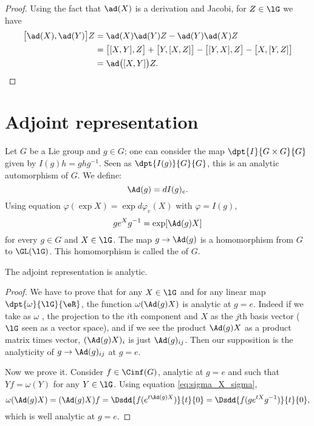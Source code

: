 \begin{proof}
    Using the fact that \( \ad(X)\) is a derivation and Jacobi, for \( Z\in\lG\) we have
    \begin{subequations}
        \begin{align}
            \big[ \ad(X),\ad(Y) \big]Z&=\ad(X)\ad(Y)Z-\ad(Y)\ad(X)Z\\
            &=\big[ [X,Y],Z \big]+\big[ Y,[X,Z] \big]-\big[ [Y,X],Z \big]-\big[ X,[Y,Z] \big]\\
            &=\ad\big( [X,Y] \big)Z.
        \end{align}
    \end{subequations}
\end{proof}

\section{Adjoint representation}

Let $G$ be a Lie group and $g\in G$; one can consider the map $\dpt{I}{G\times G}{G}$ given by $I(g)h=g hg^{-1}$. Seen as $\dpt{I(g)}{G}{G}$, this is an analytic automorphism of $G$. We define:
\[
    \Ad(g)=dI(g)_e.
\]
Using equation $\varphi(\exp X)=\exp d\varphi_e(X)$ with $\varphi=I(g)$,
\begin{equation}\label{eq:sigma_X_sigma}
  g e^{X}g^{-1}=\exp[ \Ad(g)X ]
\end{equation}
for every $g\in G$ and $X\in\lG$. The map $g\to\Ad(g)$ is a homomorphism from $G$ to $\GL(\lG)$. This homomorphism is called the  of $G$.

\begin{proposition}
The adjoint representation is analytic.
\end{proposition}

\begin{proof}
We have to prove that for any $X\in\lG$ and for any linear map $\dpt{\omega}{\lG}{\eR}$, the function $\omega(\Ad(g)X)$ is analytic at $g=e$. Indeed if we take as $\omega$ , the projection to the $i$th component and $X$ as the $j$th basis vector ($\lG$ seen as a vector space), and if we see the product $\Ad(g)X$ as a product matrix times vector, $(\Ad(g)X)_i$ is just $\Ad(g)_{ij}$. Then our supposition is the analyticity of $g\to\Ad(g)_{ij}$ at $g=e$. 

Now we prove it. Consider $f\in\Cinf(G)$, analytic at $g=e$ and such that $Yf=\omega(Y)$ for any $Y\in\lG$. Using equation \eqref{eq:sigma_X_sigma}, 
\begin{equation}
  \omega(\Ad(g)X)=(\Ad(g)X)f
                      =\Dsdd{ f(e^{t\Ad(g)X}) }{t}{0}
                      =\Dsdd{ f(g e^{tX}g^{-1}) }{t}{0},
\end{equation}
which is well analytic at $g=e$.
\end{proof}


